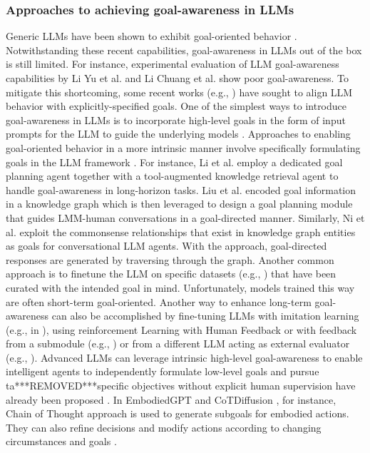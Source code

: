 \documentclass[10pt,journal,compsoc]{IEEEtran}
\begin{document}
	\subsubsection{Approaches to achieving goal-awareness in LLMs}
	Generic LLMs have been shown to exhibit goal-oriented behavior \cite{yang2024selfgoal,bellos2024can,ruis2023llms}. Notwithstanding these recent capabilities, goal-awareness in LLMs out of the box is still limited. For instance, experimental evaluation of LLM goal-awareness capabilities by Li Yu et al. \cite{li2024think}and Li Chuang et al. \cite{li2024incorporating} show poor goal-awareness. To mitigate this shortcoming, some recent works (e.g., \cite{deng2023goal,deng2023rethinking,ni2022hitkg}) have sought to align LLM behavior with explicitly-specified goals. One of the simplest ways to introduce goal-awareness in LLMs is to incorporate high-level goals in the form of input prompts for the LLM to guide the underlying models \cite{li2024towards,valmeekam2022large,yao2023value}. Approaches to enabling goal-oriented behavior in a more intrinsic manner involve specifically formulating goals in the LLM framework \cite{zhong2021keyword,deng2023unified}. For instance, Li et al. \cite{li2024incorporating} employ a dedicated goal planning agent together with a tool-augmented knowledge retrieval agent to handle goal-awareness in long-horizon tasks.  Liu et al. \cite{liu2022graph} encoded goal information in a knowledge graph which is then leveraged to design a goal planning module that guides LMM-human conversations in a goal-directed manner. Similarly, Ni et al. \cite{ni2022hitkg} exploit the commonsense relationships that exist in knowledge graph entities as goals for conversational LLM agents. With the approach, goal-directed responses are generated by traversing through the graph. Another common approach is to finetune the LLM on specific datasets (e.g., \cite{perez2022discovering,zhou2018towards,li2024think,sarkar2024gomaa}) that have been curated with the intended goal in mind. Unfortunately, models trained this way are often short-term goal-oriented. Another way to enhance long-term goal-awareness can also be accomplished by fine-tuning LLMs with imitation learning (e.g., in \cite{snell2022context}), using reinforcement Learning with Human Feedback \cite{volovikova2024instruction} or with feedback from a submodule (e.g., \cite{qin2024mp5}) or from a different LLM acting as external evaluator (e.g., \cite{barj2024reinforcement}). Advanced LLMs can leverage intrinsic high-level goal-awareness to enable intelligent agents to independently formulate low-level goals and pursue ta***REMOVED***specific objectives without explicit human supervision have already been proposed \cite{yang2024selfgoal}. In EmbodiedGPT \cite{mu2024embodiedgpt} and CoTDiffusion \cite{ni2024generate}, for instance, Chain of Thought approach is used to generate subgoals for embodied actions. They can also refine decisions and modify actions according to changing circumstances and goals \cite{yang2024selfgoal,yuan2024pre}. 
	
\end{document}
